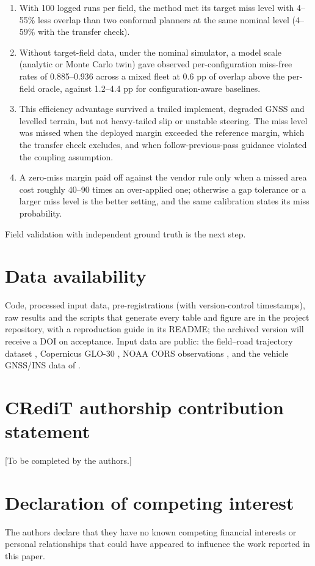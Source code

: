 \documentclass[preprint,12pt,authoryear]{elsarticle}
\providecommand{\tightlist}{\setlength{\itemsep}{0pt}\setlength{\parskip}{0pt}}
\begin{document}
\begin{enumerate}
\def\labelenumi{\arabic{enumi}.}
\tightlist
\item
  With 100 logged runs per field, the method met its target miss level with 4--55\% less overlap than two conformal planners at the same nominal level (4--59\% with the transfer check).
\item
  Without target-field data, under the nominal simulator, a model scale (analytic or Monte Carlo twin) gave observed per-configuration miss-free rates of 0.885--0.936 across a mixed fleet at 0.6 pp of overlap above the per-field oracle, against 1.2--4.4 pp for configuration-aware baselines.
\item
  This efficiency advantage survived a trailed implement, degraded GNSS and levelled terrain, but not heavy-tailed slip or unstable steering. The miss level was missed when the deployed margin exceeded the reference margin, which the transfer check excludes, and when follow-previous-pass guidance violated the coupling assumption.
\item
  A zero-miss margin paid off against the vendor rule only when a missed area cost roughly 40--90 times an over-applied one; otherwise a gap tolerance or a larger miss level is the better setting, and the same calibration states its miss probability.
\end{enumerate}

Field validation with independent ground truth is the next step.



\section*{Data availability}
Code, processed input data, pre-registrations (with version-control timestamps), raw results and the scripts that generate every table and figure are in the project repository, with a reproduction guide in its README; the archived version will receive a DOI on acceptance. Input data are public: the field--road trajectory dataset \citep{wu2023}, Copernicus GLO-30 \citep{esa2021}, NOAA CORS observations \citep{noaacors}, and the vehicle GNSS/INS data of \citet{tang2022}.

\section*{CRediT authorship contribution statement}
[To be completed by the authors.]

\section*{Declaration of competing interest}
The authors declare that they have no known competing financial interests or personal relationships that could have appeared to influence the work reported in this paper.
\end{document}
